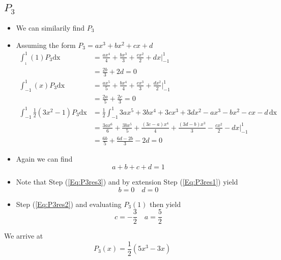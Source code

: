 \documentclass{article}
\begin{document}
    \begin{leftbar}
        \subsection{$P_3$}
        \begin{itemize}
            \item We can similarily find $P_3$
            \item Assuming the form $P_3 = ax^3 + bx^2 +cx + d$
                \begin{align}
                    \int_{_1}^{1} (1)P_3 \mathrm{dx} &= \frac{ax^4}{4}+\frac{bx^3}{3}+\frac{cx^2}{2}+dx\bigg|_{-1}^{1}\\
                                                     &= \frac{2b}{3}+2d = 0 \label{Eq:P3res1} \\
                    \int_{-1}^{1} (x)P_3 \mathrm{dx} &= \frac{ax^5}{5} + \frac{bx^4}{4}+\frac{cx^3}{3}+\frac{dx^2}{2}\bigg|_{-1}^{1}\\
                                                     &= \frac{2a}{5}+\frac{2c}{3}=0 \label{Eq:P3res2} \\
    \int_{-1}^{1} \frac{1}{2}(3x^2-1)P_3 \mathrm{dx} &= \frac{1}{2} \int_{-1}^{1} 3ax^5 + 3bx^4 + 3cx^3 + 3dx^2-ax^3-bx^2-cx-d\, \mathrm{dx} \\
                                                     &= \frac{3ax^6}{6}+\frac{3bx^5}{5}+\frac{(3c-a)x^4}{4} + \frac{(3d-b)x^3}{3}-\frac{cx^2}{2}-dx\big|_{-1}^{1} \\
                                                     &= \frac{6b}{5}+\frac{6d-2b}{3}-2d =0 \label{Eq:P3res3}
                \end{align}
            \item Again we can find
                \begin{equation}
                    a + b + c +d =1
                \end{equation}
            \item Note that Step (\ref{Eq:P3res3}) and by extension Step (\ref{Eq:P3res1}) yield
                \begin{equation}
                    b=0\quad d=0
                \end{equation}
            \item Step (\ref{Eq:P3res2}) and evaluating $P_3(1)$ then yield
                \begin{equation}
                    c = -\frac{3}{2}\quad a=\frac{5}{2}
                \end{equation}
        \end{itemize}
        We arrive at
        \begin{equation}
            P_3(x) = \frac{1}{2}(5x^3-3x)
        \end{equation}
    \end{leftbar}
    
\end{document}
